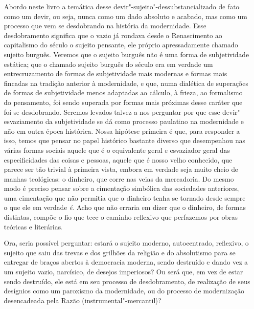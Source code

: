 Abordo neste livro a temática desse devir"-sujeito"-dessubstancializado
de fato como um devir, ou seja, nunca como um dado absoluto e acabado,
mas como um processo que vem se desdobrando na história da modernidade.
Esse desdobramento significa que o vazio já rondava desde o Renascimento
ao capitalismo do século  o sujeito pensante, ele próprio
apressadamente chamado sujeito burguês. Veremos que o sujeito burguês
não é uma forma de subjetividade estática; que o chamado sujeito burguês
do século  era em verdade um entrecruzamento de formas de
subjetividade mais modernas e formas mais fincadas na tradição anterior
à modernidade, e que, numa dialética de superações de formas de
subjetividade menos adaptadas ao cálculo, à frieza, ao formalismo do
pensamento, foi sendo superada por formas mais próximas desse caráter
que foi se desdobrando. Seremos levados talvez a nos perguntar por que
esse devir"-esvaziamento da subjetividade se dá como processo paulatino
na modernidade e não em outra época histórica. Nossa hipótese primeira é
que, para responder a isso, temos que pensar no papel histórico bastante
diverso que desempenhou nas várias formas sociais aquele que é o
equivalente geral e esvaziador geral das especificidades das coisas e
pessoas, aquele que é nosso velho conhecido, que parece ser tão trivial
à primeira vista, embora em verdade seja muito cheio de manhas
teológicas: o dinheiro, que corre nas veias da mercadoria. Do mesmo modo
é preciso pensar sobre a cimentação simbólica das sociedades anteriores,
uma cimentação que não permitia que o dinheiro tenha se tornado desde
sempre o que ele em verdade \emph{é}. Acho que não erraria em dizer que
o dinheiro, de formas distintas, compõe o fio que tece o caminho reflexivo
que perfazemos por obras teóricas e literárias.

Ora, seria possível perguntar: estará o sujeito moderno, autocentrado,
reflexivo, o sujeito que saiu das trevas e dos grilhões da religião e do
absolutismo para se entregar de braços abertos à democracia moderna,
sendo destruído e dando vez a um sujeito vazio, narcísico, de desejos
imperiosos? Ou será que, em vez de estar sendo destruído, ele está em
seu processo de desdobramento, de realização de seus desígnios como um
paroxismo da modernidade, ou do processo de modernização desencadeada
pela Razão (instrumental"-mercantil)?

